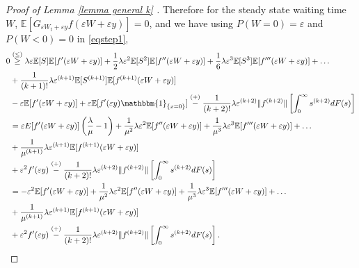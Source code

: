 \documentclass[11pt,letterpaper,reqno]{article}
\theoremstyle{thmstyleone}%
\theoremstyle{thmstyletwo}%
\theoremstyle{thmstylethree}%
\numberwithin{equation}{section}
\begin{document}
\begin{proof}[Proof of Lemma \ref{lemma general k} ]
Therefore for the steady state waiting time $W$, $ \mathbb E[G_{\varepsilon W_t+\varepsilon y}f(\varepsilon W+\varepsilon y) ]=0$, and  we have using $P(W=0)=\varepsilon$ and  $P(W<0)=0$ in \eqref{eqstep1},
\begin{align*}
    0 &\stackrel{(\leq)}{\geq} \lambda \varepsilon \mathbb E[S]\mathbb E[f'(\varepsilon W+\varepsilon y)]+\frac{1}{2}\lambda \varepsilon^2 \mathbb E[S^2]\mathbb E[f''(\varepsilon W+\varepsilon y)]+\frac{1}{6}\lambda \varepsilon^3 \mathbb E[S^3]\mathbb E[f'''(\varepsilon W+\varepsilon y)]+ \ldots\\
    &+\frac{1}{(k+1)!}\lambda \varepsilon^{(k+1)}\mathbb E[S^{(k+1)}]\mathbb E[f^{(k+1)}(\varepsilon W+\varepsilon y)]\\
       &-\varepsilon \mathbb E[f'(\varepsilon W+\varepsilon y)]+\varepsilon \mathbb E [f'(\varepsilon y)\mathbbm{1}_{\{x=0\}}]\stackrel{(+)}{-}\frac{1}{(k+2)!}\lambda \varepsilon^{(k+2)} \|f^{(k+2)}\| \left[\int_0^\infty s^{(k+2)} dF(s)\right]\\
       &=\mathbb \varepsilon E[f'(\varepsilon W+\varepsilon y)]\left(\frac{\lambda}{\mu}-1 \right)+\frac{1}{\mu^2}\lambda \varepsilon^2 \mathbb E[f''(\varepsilon W+\varepsilon y)]+\frac{1}{\mu^3}\lambda \varepsilon^3 \mathbb E[f'''(\varepsilon W+\varepsilon y)]+ \ldots\\
    &+\frac{1}{\mu^{(k+1)}}\lambda \varepsilon^{(k+1)}\mathbb E[f^{(k+1)}(\varepsilon W+\varepsilon y)]\\
       &+\varepsilon^2 f'(\varepsilon y)\stackrel{(+)}{-}\frac{1}{(k+2)!}\lambda \varepsilon^{(k+2)} \|f^{(k+2)}\| \left[\int_0^\infty s^{(k+2)} dF(s)\right]\\
        &=-\varepsilon^2\mathbb E[f'(\varepsilon W+\varepsilon y)]+\frac{1}{\mu^2}\lambda \varepsilon^2 \mathbb E[f''(\varepsilon W+\varepsilon y)]+\frac{1}{\mu^3}\lambda \varepsilon^3 \mathbb E[f'''(\varepsilon W+\varepsilon y)]+ \ldots\\
    &+\frac{1}{\mu^{(k+1)}}\lambda \varepsilon^{(k+1)}\mathbb E[f^{(k+1)}(\varepsilon W+\varepsilon y)]\\
       &+\varepsilon^2 f'(\varepsilon y)\stackrel{(+)}{-}\frac{1}{(k+2)!}\lambda \varepsilon^{(k+2)}\|f^{(k+2)}\| \left[\int_0^\infty s^{(k+2)}dF(s)\right].\\
\end{align*}


\end{proof}
\end{document}
